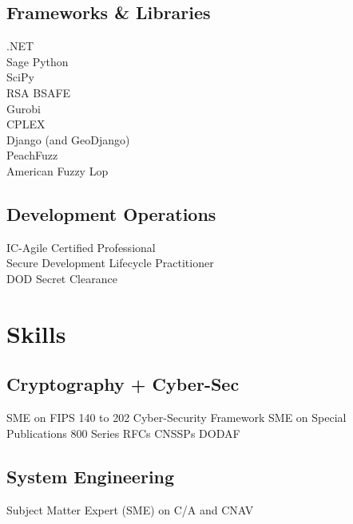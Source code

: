 \documentclass[letterpaper]{clinton-resume}
\begin{document}
\begin{minipage}[t]{0.33\textwidth}
\sectionspace %

\subsection{Frameworks \& Libraries}
.NET\\
Sage Python\\
SciPy\\
RSA BSAFE\\
Gurobi\\
CPLEX\\
Django (and GeoDjango)\\
PeachFuzz\\
American Fuzzy Lop\\
\sectionspace %
\subsection{Development Operations}
IC-Agile Certified Professional\\
Secure Development Lifecycle Practitioner\\
DOD Secret Clearance\\
\sectionspace %
\section{Skills}
\subsection{Cryptography + Cyber-Sec}
SME on FIPS 140 to 202 \textbullet{} Cyber-Security Framework \textbullet{} SME on Special Publications 800 Series \textbullet{} RFCs \textbullet{} CNSSPs \textbullet{} DODAF\\
\subsection{System Engineering}
Subject Matter Expert (SME) on C/A and CNAV
\end{minipage}
\end{document}
